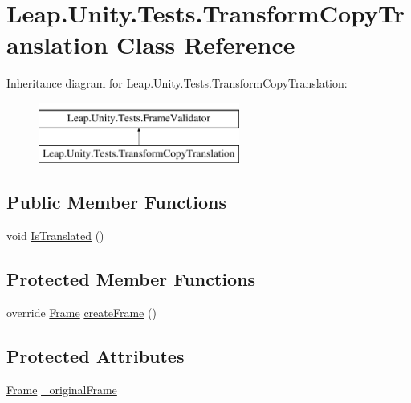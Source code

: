 \hypertarget{class_leap_1_1_unity_1_1_tests_1_1_transform_copy_translation}{}\section{Leap.\+Unity.\+Tests.\+Transform\+Copy\+Translation Class Reference}
\label{class_leap_1_1_unity_1_1_tests_1_1_transform_copy_translation}
Inheritance diagram for Leap.\+Unity.\+Tests.\+Transform\+Copy\+Translation\+:\begin{figure}[H]
\begin{center}
\leavevmode
\includegraphics[height=2.000000cm]{class_leap_1_1_unity_1_1_tests_1_1_transform_copy_translation}
\end{center}
\end{figure}
\subsection*{Public Member Functions}
\begin{DoxyCompactItemize}
\item 
void \mbox{\hyperlink{class_leap_1_1_unity_1_1_tests_1_1_transform_copy_translation_a054ff9a6408b4c0cce4bce27620ce67e}{Is\+Translated}} ()
\end{DoxyCompactItemize}
\subsection*{Protected Member Functions}
\begin{DoxyCompactItemize}
\item 
override \mbox{\hyperlink{class_leap_1_1_frame}{Frame}} \mbox{\hyperlink{class_leap_1_1_unity_1_1_tests_1_1_transform_copy_translation_abaa9e440cd40e50c4d4e46ab6eb3fbc4}{create\+Frame}} ()
\end{DoxyCompactItemize}
\subsection*{Protected Attributes}
\begin{DoxyCompactItemize}
\item 
\mbox{\hyperlink{class_leap_1_1_frame}{Frame}} \mbox{\hyperlink{class_leap_1_1_unity_1_1_tests_1_1_transform_copy_translation_a0b65a9ec9a4d6c68e7023712b4eb4b11}{\+\_\+original\+Frame}}
\end{DoxyCompactItemize}
